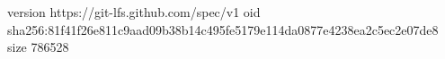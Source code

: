version https://git-lfs.github.com/spec/v1
oid sha256:81f41f26e811c9aad09b38b14c495fe5179e114da0877e4238ea2c5ec2e07de8
size 786528
